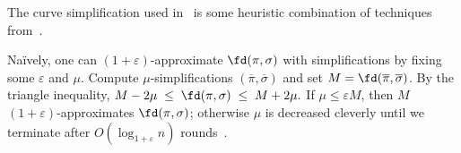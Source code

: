 \noindent
The curve simplification used in~\cite{harpeled_et_al:LIPIcs.SoCG.2025.54} is some heuristic combination of techniques from~\cite{AronovHKWW06, DriemelHW10}.
\noindent

Naïvely, one can $(1+\varepsilon)$-approximate $\fd(\pi, \sigma)$ with simplifications by fixing some $\varepsilon$ and $\mu$. Compute $\mu$-simplifications $(\overline{\pi},\overline{\sigma})$ and set $M=\fd(\overline{\pi},\overline{\sigma})$. 
By the triangle inequality, $
M-2\mu \;\leq\; \fd(\pi,\sigma) \;\leq\; M+2\mu.$
If $\mu\leq \varepsilon M$, then $M$ $(1+\varepsilon)$-approximates $\fd(\pi,\sigma)$; otherwise $\mu$ is decreased cleverly until we terminate   after $O(\log_{1+\varepsilon} n)$ rounds~\cite{DriemelHW10}.

